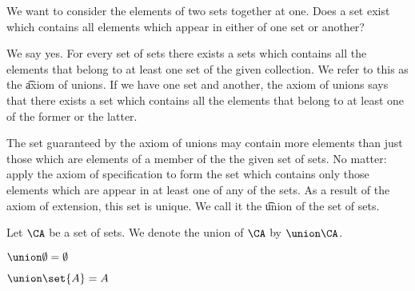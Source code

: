 

We want to consider the elements of two sets together at one.
Does a set exist which contains all elements which appear in either of one set or another?


We say yes.
For every set of sets there exists a sets which contains all the elements that belong to at least one set of the given collection.
We refer to this as the \t{axiom of unions}.
If we have one set and another, the axiom of unions says that there exists a set which contains all the elements that belong to at least one of the former or the latter.

The set guaranteed by the axiom of unions may contain more elements than just those which are elements of a member of the the given set of sets.
No matter: apply the axiom of specification to form the set which contains only those elements which are appear in at least one of any of the sets.
As a result of the axiom of extension, this set is unique.
We call it the \t{union} of the set of sets.


Let $\CA$ be a set of sets.
We denote the union of $\CA$ by $\union \CA$.


\begin{prop}
$\union \emptyset = \emptyset$
\end{prop}

\begin{prop}
$\union \set{A} = A$
\end{prop}
